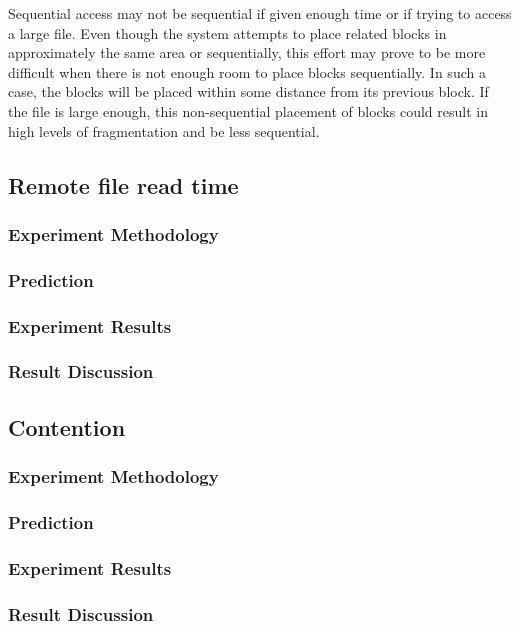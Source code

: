 \documentclass{article} %
\begin{document}
Sequential access may not be sequential if given enough time or if trying to access a large file. Even though the system attempts to place related blocks in approximately the same area or sequentially, this effort may prove to be more difficult when there is not enough room to place blocks sequentially. In such a case, the blocks will be placed within some distance from its previous block. If the file is large enough, this non-sequential placement of blocks could result in high levels of fragmentation and be less sequential.

\subsection{Remote file read time}

\subsubsection{Experiment Methodology}
\subsubsection{Prediction}
\subsubsection{Experiment Results}
\subsubsection{Result Discussion}

\subsection{Contention}

\subsubsection{Experiment Methodology}
\subsubsection{Prediction}
\subsubsection{Experiment Results}
\subsubsection{Result Discussion}
\end{document}
